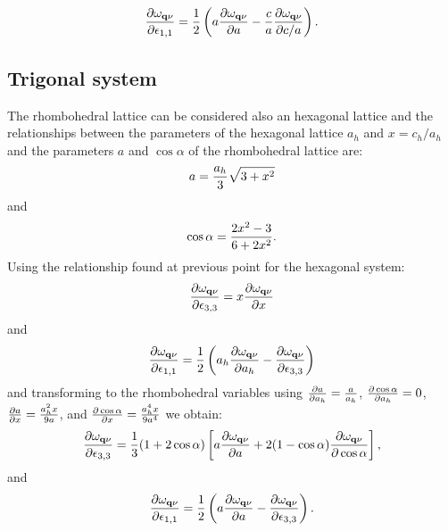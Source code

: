 \documentclass[12pt,a4paper]{article}
\begin{document}
\begin{equation}
{\partial \omega_{{\bf q}\nu} \over \partial \epsilon_{1,1}} = {1\over 2} 
\left(a  
{\partial \omega_{{\bf q}\nu} \over \partial a} -
{c\over a} {\partial \omega_{{\bf q}\nu} \over \partial c/a}\right).
\end{equation}
 
\subsection{\color{web-blue}Trigonal system}
The rhombohedral lattice can be considered also an hexagonal lattice and 
the relationships between the parameters of the hexagonal lattice
$a_h$ and $x=c_h/a_h$ and the parameters $a$ and $\cos \alpha$ of the
rhombohedral lattice are:
\begin{equation}
a={a_h \over 3} \sqrt{3 + x^2}
\end{equation}
and
\begin{equation}
\cos\alpha={ 2 x^2 - 3 \over 6 + 2 x^2}.
\end{equation}
Using the relationship found at previous point for the hexagonal system:
\begin{equation}
{\partial \omega_{{\bf q}\nu} 
\over \partial \epsilon_{3,3}} = x {\partial \omega_{{\bf q}\nu} 
\over \partial x}
\end{equation}
and
\begin{equation}
{\partial \omega_{{\bf q}\nu} 
\over \partial \epsilon_{1,1}} = 
{1\over 2} \left(a_h {\partial \omega_{{\bf q}\nu} \over \partial a_h} - 
{\partial \omega_{{\bf q}\nu} \over \partial 
\epsilon_{3,3}} \right)
\end{equation}
and transforming to the rhombohedral variables using ${\partial a \over \partial
a_h}={a\over a_h}$, ${\partial \cos \alpha \over \partial
a_h}=0$, ${\partial a \over \partial x}={a_h^2 x \over 9 a}$, and
${\partial \cos \alpha \over \partial
x}={ a_h^4 x \over 9 a^4}$ we obtain:
\begin{equation}
{\partial \omega_{{\bf q}\nu} 
\over \partial \epsilon_{3,3}} = {1\over 3} (1 + 2 \cos \alpha)
\left[ a {\partial \omega_{{\bf q}\nu} \over \partial a} +
2 (1-\cos\alpha) {\partial \omega_{{\bf q}\nu} \over \partial \cos \alpha}
\right],
\end{equation}
and
\begin{equation}
{\partial \omega_{{\bf q}\nu} \over \partial \epsilon_{1,1}} = 
{1\over 2} \left(a {\partial \omega_{{\bf q}\nu} \over \partial a} - {\partial 
\omega_{{\bf q}\nu} \over \partial 
\epsilon_{3,3}} \right).
\end{equation}
\end{document}
